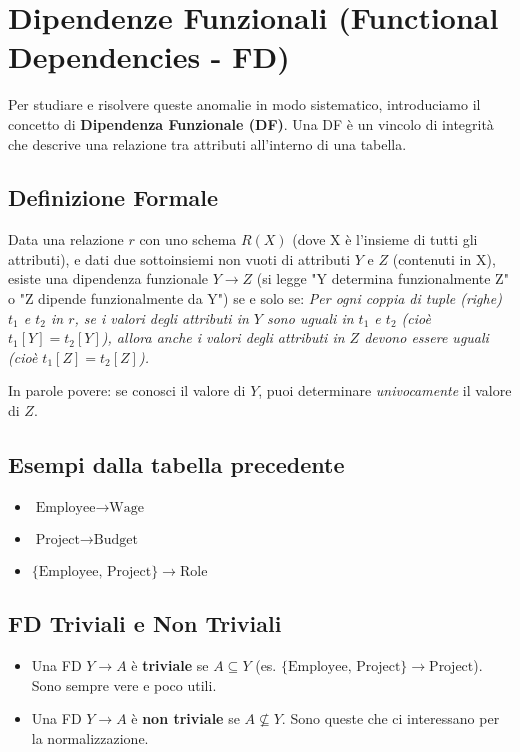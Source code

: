 \documentclass{article}
\begin{document}
	\section{Dipendenze Funzionali (Functional Dependencies - FD)}
	Per studiare e risolvere queste anomalie in modo sistematico, introduciamo il concetto di \textbf{Dipendenza Funzionale (DF)}.
	Una DF è un vincolo di integrità che descrive una relazione tra attributi all'interno di una tabella.
	
	\subsection{Definizione Formale}
	Data una relazione $r$ con uno schema $R(X)$ (dove X è l'insieme di tutti gli attributi), e dati due sottoinsiemi non vuoti di attributi $Y$ e $Z$ (contenuti in X), esiste una dipendenza funzionale $Y \rightarrow Z$ (si legge "Y determina funzionalmente Z" o "Z dipende funzionalmente da Y") se e solo se:
	\textit{Per ogni coppia di tuple (righe) $t_1$ e $t_2$ in $r$, se i valori degli attributi in $Y$ sono uguali in $t_1$ e $t_2$ (cioè $t_1[Y] = t_2[Y]$), allora anche i valori degli attributi in $Z$ devono essere uguali (cioè $t_1[Z] = t_2[Z]$).}
	
	In parole povere: se conosci il valore di $Y$, puoi determinare \textit{univocamente} il valore di $Z$.
	
	\subsection{Esempi dalla tabella precedente}
	\begin{itemize}
		\item $\text{Employee} \rightarrow \text{Wage}$
		\item $\text{Project} \rightarrow \text{Budget}$
		\item $\{\text{Employee, Project}\} \rightarrow \text{Role}$
	\end{itemize}
	
	\subsection{FD Triviali e Non Triviali}
	\begin{itemize}
		\item Una FD $Y \rightarrow A$ è \textbf{triviale} se $A \subseteq Y$ (es. $\{\text{Employee, Project}\} \rightarrow \text{Project}$). Sono sempre vere e poco utili.
		\item Una FD $Y \rightarrow A$ è \textbf{non triviale} se $A \not\subseteq Y$. Sono queste che ci interessano per la normalizzazione.
	\end{itemize}
	
\end{document}
